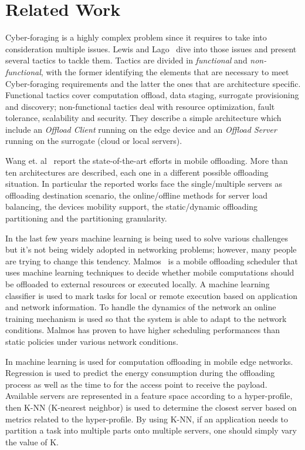 \chapter{Related Work}
Cyber-foraging is a highly complex problem since it requires to take into consideration multiple issues. Lewis and Lago~\cite{catalog} dive into those issues and present several tactics to tackle them. Tactics are divided in \textit{functional} and \textit{non-functional}, with the former identifying the elements that are necessary to meet Cyber-foraging requirements and the latter the ones that are architecture specific. Functional tactics cover computation offload, data staging, surrogate provisioning and discovery; non-functional tactics deal with resource optimization, fault tolerance, scalability and security. They describe a simple architecture which include an \textit{Offload Client} running on the edge device and an \textit{Offload Server} running on the surrogate (cloud or local servers).

Wang et. al~\cite{edge_cloud_offloading_undersubmission:} report the state-of-the-art efforts in mobile offloading. More than ten architectures are described, each one in a different possible offloading situation. In particular the reported works face the single/multiple servers as offloading destination scenario, the online/offline methods for server load balancing, the devices mobility support, the static/dynamic offloading partitioning and the partitioning granularity.

In the last few years machine learning is being used to solve various challenges but it's not being widely adopted in networking problems; however, many people are trying to change this tendency. Malmos~\cite{malmos} is a mobile offloading scheduler that uses machine learning techniques to decide whether mobile computations should be offloaded to external resources or executed locally. A machine learning classifier is used to mark tasks for local or remote execution based on application and network information. To handle the dynamics of the network an online training mechanism is used so that the system is able to adapt to the network conditions. Malmos has proven to have higher scheduling performances than static policies under various network conditions.

In \cite{hyperprofile_undersubmission:} machine learning is used for computation offloading in mobile edge networks. Regression is used to predict the energy consumption during the offloading process as well as the time to for the access point to receive the payload. Available servers are represented in a feature space according to a hyper-profile, then K-NN (K-nearest neighbor) is used to determine the closest server based on metrics related to the hyper-profile. By using K-NN, if an application needs to partition a task into multiple parts onto multiple servers, one should simply vary the value of K. 

